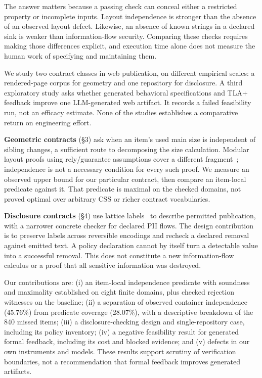 \documentclass[acmsmall,screen,review,anonymous,nonacm]{acmart}
\begin{document}
The answer matters because a passing check can conceal either a restricted property or incomplete inputs. Layout independence is stronger than the absence of an observed layout defect. Likewise, an absence of known strings in a declared sink is weaker than information-flow security. Comparing these checks requires making those differences explicit, and execution time alone does not measure the human work of specifying and maintaining them.

We study two contract classes in web publication, on different empirical scales: a rendered-page corpus for geometry and one repository for disclosure. A third exploratory study asks whether generated behavioral specifications and TLA+ feedback improve one LLM-generated web artifact. It records a failed feasibility run, not an efficacy estimate. None of the studies establishes a comparative return on engineering effort.

\textbf{Geometric contracts} (\S3) ask when an item's used main size is independent of sibling changes, a sufficient route to decomposing the size calculation. Modular layout proofs using rely/guarantee assumptions cover a different fragment~\cite{troika2019}; independence is not a necessary condition for every such proof. We measure an observed upper bound for our particular contract, then compare an item-local predicate against it. That predicate is maximal on the checked domains, not proved optimal over arbitrary CSS or richer contract vocabularies.

\textbf{Disclosure contracts} (\S4) use lattice labels~\cite{denning1976} to describe permitted publication, with a narrower concrete checker for declared PII flows. The design contribution is to preserve labels across reversible encodings and recheck a declared removal against emitted text. A policy declaration cannot by itself turn a detectable value into a successful removal. This does not constitute a new information-flow calculus or a proof that all sensitive information was destroyed.

Our contributions are: (i) an item-local independence predicate with soundness and maximality established on eight finite domains, plus checked rejection witnesses on the baseline; (ii) a separation of observed container independence (45.76\%) from predicate coverage (28.07\%), with a descriptive breakdown of the 840 missed items; (iii) a disclosure-checking design and single-repository case, including its policy inventory; (iv) a negative feasibility result for generated formal feedback, including its cost and blocked evidence; and (v) defects in our own instruments and models. These results support scrutiny of verification boundaries, not a recommendation that formal feedback improves generated artifacts.
\end{document}

